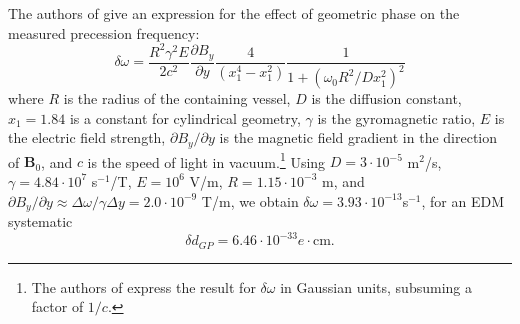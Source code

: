 \documentclass [10pt, twoside] {uwthesis}[2012/04/02]
\begin{document}
The authors of \cite{2005_Lamoreaux_and_Golub_nEDM_geometric_phase} give an expression for the effect of geometric phase on the measured precession frequency:
\begin{equation}
\label{GPsystematic}
\delta \omega = \dfrac{R^2\gamma^2E}{2 c^2}\dfrac{\partial B_y}{\partial y} \dfrac{4}{(x_1^4- x_1^2)} \dfrac{1}{1+(\omega_0 R^2/Dx_1^2)^2}
\end{equation}	
where $R$ is the radius of the containing vessel, $D$ is the diffusion constant, $x_1 = 1.84$ is a constant for cylindrical geometry, $\gamma$ is the gyromagnetic ratio, $E$ is the electric field strength, $\partial B_y / \partial y$ is the magnetic field gradient in the direction of $\mathbf{B}_0$, and $c$ is the speed of light in vacuum.\footnote{The authors of \cite{2005_Lamoreaux_and_Golub_nEDM_geometric_phase} express the result for $\delta \omega$ in Gaussian units, subsuming a factor of $1/c$.} Using $D = 3\cdot10^{-5}$ m$^2$/s, $\gamma = 4.84\cdot 10^7$ s$^{-1}$/T, $E = 10^6$ V/m, $R = 1.15 \cdot 10^{-3}$ m, and $\partial B_y / \partial y \approx \Delta \omega / \gamma \Delta y  = 2.0 \cdot 10^{-9}$ T/m, we obtain $\delta \omega = 3.93\cdot 10^{-13}$s$^{-1}$, for an EDM systematic  
\begin{equation}
\delta d_{GP} = 6.46\cdot 10^{-33} e\cdot \text{cm}.
\end{equation} 
\end{document}
